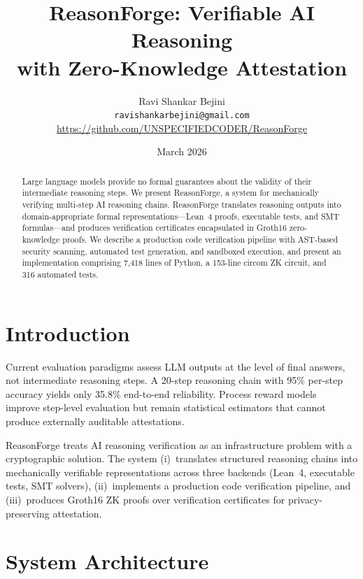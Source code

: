 \documentclass[10pt,a4paper,twocolumn]{article}
\title{\textbf{ReasonForge: Verifiable AI Reasoning\\
with Zero-Knowledge Attestation}}
\author{
  Ravi Shankar Bejini\\
  \texttt{ravishankarbejini@gmail.com}\\
  \small\url{https://github.com/UNSPECIFIEDCODER/ReasonForge}
}
\date{March 2026}
\begin{document}
\maketitle

\begin{abstract}
Large language models provide no formal guarantees about the validity of
their intermediate reasoning steps.  We present ReasonForge, a system for
mechanically verifying multi-step AI reasoning chains.  ReasonForge
translates reasoning outputs into domain-appropriate formal
representations---Lean~4 proofs, executable tests, and SMT
formulas---and produces verification certificates encapsulated in
Groth16 zero-knowledge proofs.  We describe a production code
verification pipeline with AST-based security scanning, automated test
generation, and sandboxed execution, and present an implementation
comprising 7{,}418 lines of Python, a 153-line circom ZK circuit, and
316 automated tests.
\end{abstract}

\section{Introduction}

Current evaluation paradigms assess LLM outputs at the level of final
answers, not intermediate reasoning steps.  A 20-step reasoning chain
with 95\% per-step accuracy yields only 35.8\% end-to-end reliability.
Process reward models~\citep{lightman2023verify} improve step-level
evaluation but remain statistical estimators that cannot produce
externally auditable attestations.

ReasonForge treats AI reasoning verification as an infrastructure problem
with a cryptographic solution.  The system (i)~translates structured
reasoning chains into mechanically verifiable representations across
three backends (Lean~4, executable tests, SMT solvers), (ii)~implements a
production code verification pipeline, and (iii)~produces Groth16 ZK
proofs over verification certificates for privacy-preserving attestation.

\section{System Architecture}
\end{document}
